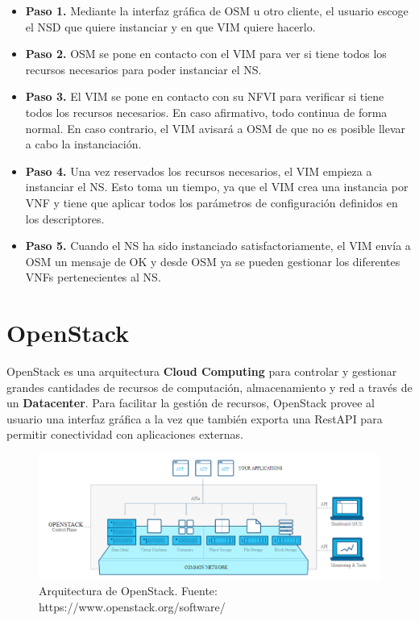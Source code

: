 \begin{itemize}
	\item \textbf{Paso 1.} Mediante la interfaz gráfica de OSM u otro cliente, el usuario escoge el NSD que quiere instanciar y en que VIM quiere hacerlo.
	
	\item \textbf{Paso 2.} OSM se pone en contacto con el VIM para ver si tiene todos los recursos necesarios para poder instanciar el NS.
	
	\item \textbf{Paso 3.} El VIM se pone en contacto con su NFVI para verificar si tiene todos los recursos necesarios. En caso afirmativo, todo continua de forma normal. En caso contrario, el VIM avisará a OSM de que no es posible llevar a cabo la instanciación.
	
	\item \textbf{Paso 4.} Una vez reservados los recursos necesarios, el VIM empieza a instanciar el NS. Esto toma un tiempo, ya que el VIM crea una instancia por VNF y tiene que aplicar todos los parámetros de configuración definidos en los descriptores.
	
	\item \textbf{Paso 5.} Cuando el NS ha sido instanciado satisfactoriamente, el VIM envía a OSM un mensaje de OK y desde OSM ya se pueden gestionar los diferentes VNFs pertenecientes al NS.
\end{itemize}


\section{OpenStack}
\label{sec:openstack}

OpenStack es una arquitectura \textbf{Cloud Computing} para controlar y gestionar grandes cantidades de recursos de computación, almacenamiento y red a través de un \textbf{Datacenter}. Para facilitar la gestión de recursos, OpenStack provee al usuario una interfaz gráfica a la vez que también exporta una RestAPI para permitir conectividad con aplicaciones externas.

\begin{figure}[!ht]
	\centering
	\includegraphics[width=0.9\linewidth]{imagenes/openstack_arch}
	\caption{Arquitectura de OpenStack. Fuente: https://www.openstack.org/software/}
	\label{fig:openstackarch}
\end{figure}

